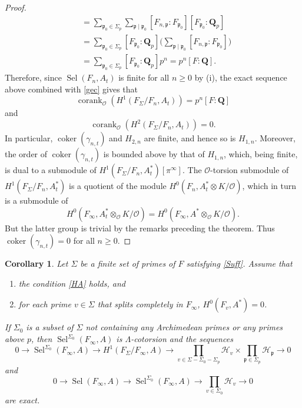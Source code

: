\documentclass[12 pt]{amsart}
\theoremstyle{plain}
\newtheorem{cor}[thm]{Corollary}
\theoremstyle{definition}
\numberwithin{equation}{section}
\numberwithin{table}{section}
\begin{document}
\begin{proof}
\begin{align*}
&=\sum_{\mathfrak{p}_0\in\Sigma_p}\sum_{\mathfrak{p}\mid \mathfrak{p}_0}[F_{n,\mathfrak{p}}:F_{\mathfrak{p}_0}][F_{\mathfrak{p}_0}:\mathbf{Q}_p]\\
&=\sum_{\mathfrak{p}_0\in\Sigma_p}[F_{\mathfrak{p}_0}:\mathbf{Q}_p]\Bigg(\sum_{\mathfrak{p}\mid\mathfrak{p}_0}[F_{n,\mathfrak{p}}:F_{\mathfrak{p}_0}]\Bigg)\\
&=\sum_{\mathfrak{p}_0\in\Sigma_p}[F_{\mathfrak{p}_0}:\mathbf{Q}_p]p^n=p^n[F:\mathbf{Q}]\text{.}
\end{align*}
Therefore, since $\operatorname{Sel}(F_n,A_t)$ is finite for all $n\geq 0$ by (i), the exact sequence above combined with \cref{gec} gives that
\begin{equation*}
\operatorname{corank}_\mathscr{O}(H^1(F_\Sigma/F_n,A_t))=p^n[F:\mathbf{Q}]
\end{equation*}
and
\begin{equation*}
\operatorname{corank}_\mathscr{O}(H^2(F_\Sigma/F_n,A_t))=0\text{.}
\end{equation*}
In particular, $\operatorname{coker}(\gamma_{n,t})$ and $H_{2,n}$ are finite, and hence so is $H_{1,n}$. Moreover, the order of $\operatorname{coker}(\gamma_{n,t})$ is bounded above by that of $H_{1,n}$, which, being finite, is dual to a submodule of $H^1(F_\Sigma/F_n,A_t^*)[\pi^\infty]$. The $\mathscr{O}$-torsion submodule of $H^1(F_\Sigma/F_n,A_t^*)$ is a quotient of the module $H^0(F_n,A_t^*\otimes K/\mathscr{O})$, which in turn is a submodule of
\begin{equation*}
H^0(F_\infty,A_t^*\otimes_\mathscr{O}K/\mathscr{O})=H^0(F_\infty,A^*\otimes_\mathscr{O}K/\mathscr{O})\text{.}
\end{equation*}
But the latter group is trivial by the remarks preceding the theorem. Thus $\operatorname{coker}(\gamma_{n,t})=0$ for all $n\geq 0$.
\end{proof}
\begin{cor}
\label{sel-surj-2}
Let $\Sigma$ be a finite set of primes of $F$ satisfying \emph{\cref{Suff}}. Assume that
\begin{enumerate}
\item the condition \emph{\cref{HA}} holds, and
\item for each prime $v\in\Sigma$ that splits completely in $F_\infty$, $H^0(F_v,A^*)=0$.
\end{enumerate}
If $\Sigma_0$ is a subset of $\Sigma$ not containing any Archimedean primes or any primes above $p$, then $\operatorname{Sel}^{\Sigma_0}(F_\infty,A)$ is $\Lambda$-cotorsion and the sequences
\begin{equation*}
0\rightarrow\operatorname{Sel}^{\Sigma_0}(F_\infty,A)\rightarrow H^1(F_\Sigma/F_\infty,A)\rightarrow\prod_{v\in\Sigma-\Sigma_0-\Sigma_p}\mathcal{H}_v\times\prod_{\mathfrak{p}\in\Sigma_p}\mathcal{H}_\mathfrak{p}
\rightarrow 0
\end{equation*}
and
\begin{equation*}
0\rightarrow\operatorname{Sel}(F_\infty,A)\rightarrow\operatorname{Sel}^{\Sigma_0}(F_\infty,A)\rightarrow\prod_{v\in\Sigma_0}\mathcal{H}_v\rightarrow 0
\end{equation*}
are exact.
\end{cor}
\end{document}
